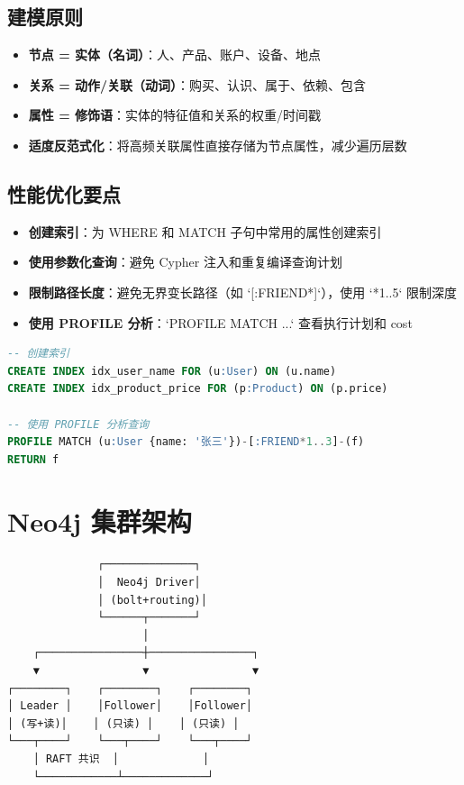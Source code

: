\documentclass[12pt,UTF8]{ctexbook}
\begin{document}
\subsection*{建模原则}

\begin{itemize}
    \item \textbf{节点 = 实体（名词）}：人、产品、账户、设备、地点
    \item \textbf{关系 = 动作/关联（动词）}：购买、认识、属于、依赖、包含
    \item \textbf{属性 = 修饰语}：实体的特征值和关系的权重/时间戳
    \item \textbf{适度反范式化}：将高频关联属性直接存储为节点属性，减少遍历层数
\end{itemize}

\subsection*{性能优化要点}

\begin{itemize}
    \item \textbf{创建索引}：为 WHERE 和 MATCH 子句中常用的属性创建索引
    \item \textbf{使用参数化查询}：避免 Cypher 注入和重复编译查询计划
    \item \textbf{限制路径长度}：避免无界变长路径（如 `[:FRIEND*]`），使用 `*1..5` 限制深度
    \item \textbf{使用 PROFILE 分析}：`PROFILE MATCH ...` 查看执行计划和 cost
\end{itemize}

\begin{lstlisting}[language=sql]
-- 创建索引
CREATE INDEX idx_user_name FOR (u:User) ON (u.name)
CREATE INDEX idx_product_price FOR (p:Product) ON (p.price)

-- 使用 PROFILE 分析查询
PROFILE MATCH (u:User {name: '张三'})-[:FRIEND*1..3]-(f)
RETURN f
\end{lstlisting}

\section{Neo4j 集群架构}
\label{sec:neo4j-cluster}

\begin{lstlisting}
              ┌──────────────┐
              │  Neo4j Driver│
              │ (bolt+routing)│
              └──────┬───────┘
                     │
    ┌────────────────┼────────────────┐
    ▼                ▼                ▼
┌────────┐    ┌────────┐    ┌────────┐
│ Leader │    │Follower│    │Follower│
│ (写+读)│    │ (只读) │    │ (只读) │
└───┬────┘    └───┬────┘    └───┬────┘
    │ RAFT 共识  │             │
    └────────────┴─────────────┘
\end{lstlisting}
\end{document}
